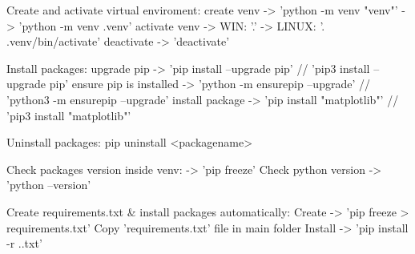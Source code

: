 Create and activate virtual enviroment:
create venv     -> 'python -m venv "venv"'
		        -> 'python -m venv .venv'
activate venv   -> WIN: '.\venv\Scripts\activate'
	 	        -> LINUX: '. .venv/bin/activate'
deactivate      -> 'deactivate'


Install packages:
upgrade pip 		    -> 'pip install --upgrade pip' // 'pip3 install --upgrade pip'
ensure pip is installed -> 'python -m ensurepip --upgrade' // 'python3 -m ensurepip --upgrade'
install package 	    -> 'pip install "matplotlib"' // 'pip3 install "matplotlib"'

Uninstall packages:
pip uninstall  <packagename> 

Check packages version inside venv: -> 'pip freeze'
Check python version                -> 'python --version'

Create requirements.txt & install packages automatically:
Create  -> 'pip freeze > requirements.txt'
Copy 'requirements.txt' file in main folder
Install -> 'pip install -r .\requirements.txt'
